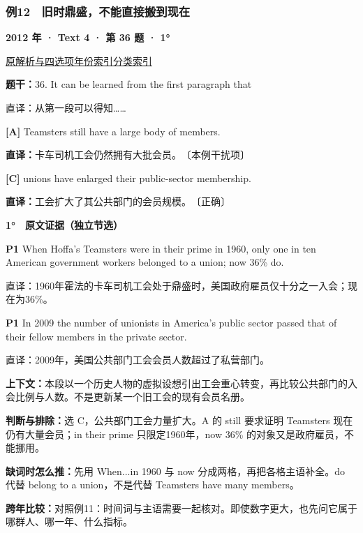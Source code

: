\documentclass[11pt,a4paper]{article}
\begin{document}
\subsubsection{例12　旧时鼎盛，不能直接搬到现在}\label{case-2012-T4-Q36}
\noindent\textbf{2012 年 · Text 4 · 第 36 题 · 1°}\par\noindent \href{https://zj139.github.io/math-notes/english/2567aa708876e7f62db07164/\#q36}{原解析与四选项}\quad \hyperref[idx-2012-T4-Q36]{年份索引}\quad \hyperref[class-R06]{分类索引}\par\smallskip
\noindent\textbf{题干：}36. It can be learned from the first paragraph that\par
直译：从第一段可以得知……\par
{}\noindent\textbf{[A]} Teamsters still have a large body of members.\par\nopagebreak
\noindent\textbf{直译：}卡车司机工会仍然拥有大批会员。　〔本例干扰项〕\par
{}\noindent\textbf{[C]} unions have enlarged their public-sector membership.\par\nopagebreak
\noindent\textbf{直译：}工会扩大了其公共部门的会员规模。　〔正确〕\par
\begin{evidence}\textbf{1°　原文证据（独立节选）}\par
\textbf{P1} When Hoffa's Teamsters were in their prime in 1960, only one in ten American government workers belonged to a union; now 36\% do.\par 直译：1960年霍法的卡车司机工会处于鼎盛时，美国政府雇员仅十分之一入会；现在为36\%。\par
\textbf{P1} In 2009 the number of unionists in America's public sector passed that of their fellow members in the private sector.\par 直译：2009年，美国公共部门工会会员人数超过了私营部门。\par
\end{evidence}
\noindent\textbf{上下文：}本段以一个历史人物的虚拟设想引出工会重心转变，再比较公共部门的入会比例与人数。不是更新某一个旧工会的现有会员名册。\par
\noindent\textbf{判断与排除：}选 C，公共部门工会力量扩大。A 的 still 要求证明 Teamsters 现在仍有大量会员；in their prime 只限定1960年，now 36\% 的对象又是政府雇员，不能挪用。\par
\noindent\textbf{缺词时怎么推：}先用 When...in 1960 与 now 分成两格，再把各格主语补全。do 代替 belong to a union，不是代替 Teamsters have many members。\par
\noindent\textbf{跨年比较：}对照例11：时间词与主语需要一起核对。即使数字更大，也先问它属于哪群人、哪一年、什么指标。\par
\clearpage
\end{document}
